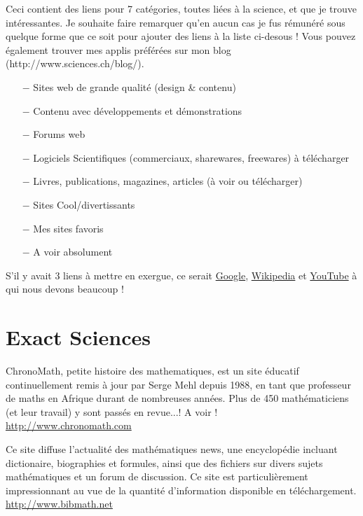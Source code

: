	Ceci contient des liens pour 7 catégories, toutes liées à la science, et que je trouve intéressantes. Je souhaite faire remarquer qu'en aucun cas je fus rémunéré sous quelque forme que ce soit pour ajouter des liens à la liste ci-desous ! Vous pouvez également trouver mes applis préférées sur mon blog (http://www.sciences.ch/blog/). 
	
	\begin{itemize}	 
		\item[$-$] {\Large {}} Sites web de grande qualité (design & contenu)
		\item[$-$] {\Large {}} Contenu avec développements et démonstrations
		\item[$-$] {\Large {}} Forums web
		\item[$-$] {\Large {}} Logiciels Scientifiques (commerciaux, sharewares, freewares) à télécharger
		\item[$-$] {\Large {}} Livres, publications, magazines, articles (à voir ou télécharger)
		\item[$-$] {\Large {}} Sites Cool/divertissants
		\item[$-$] {\Large {}} Mes sites favoris
		\item[$-$] {\Large {}} A voir absolument
	\end{itemize}
	
	S'il y avait 3 liens à mettre en exergue, ce serait \href{http://www.google.com}{\color{blue} Google}, \href{http://www.wikipedia.com}{\color{blue} Wikipedia} et \href{http://www.youtube.com}{\color{blue} YouTube} à qui nous devons beaucoup !		

	\pagebreak

	\section{Exact Sciences}

	{\Large {}}{\Large {}}{\Large {}}{\Large {}}{\Large {}}{\Large {}}\bcdfrance{} ChronoMath, petite histoire des mathematiques, est un site éducatif continuellement remis à jour par Serge Mehl depuis 1988, en tant que professeur de maths en Afrique durant de nombreuses années. Plus de 450 mathématiciens (et leur travail) y sont passés en revue...! A voir !\\
	\href{http://www.chronomath.com}{\color{blue} http://www.chronomath.com}
	
	{\Large {}}{\Large {}}{\Large {}}\bcdfrance{} Ce site diffuse l'actualité des mathématiques news, une encyclopédie incluant dictionaire, biographies et formules, ainsi que des fichiers sur divers sujets mathématiques et un forum de discussion. Ce site est particulièrement impressionnant au vue de la quantité d'information disponible en téléchargement. \\
	\href{http://www.bibmath.net}{\color{blue} http://www.bibmath.net} 
	
